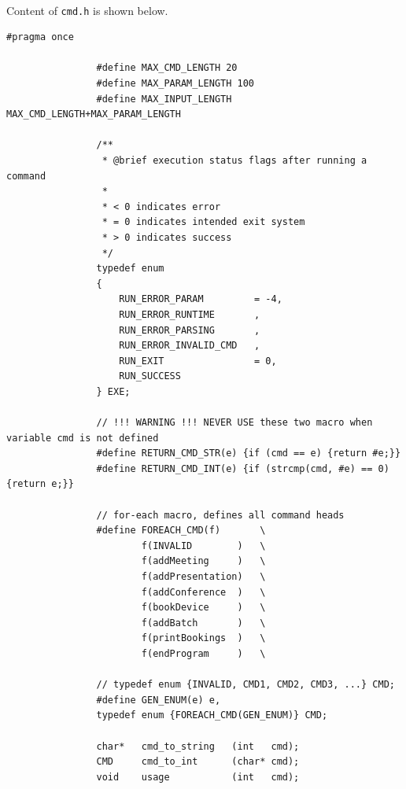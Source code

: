\documentclass{article}
\begin{document}
            \paragraph{}
                Content of \texttt{cmd.h} is shown below.
            \begin{Verbatim}[gobble=8]
                #pragma once

                #define MAX_CMD_LENGTH 20
                #define MAX_PARAM_LENGTH 100
                #define MAX_INPUT_LENGTH MAX_CMD_LENGTH+MAX_PARAM_LENGTH
                
                /**
                 * @brief execution status flags after running a command
                 * 
                 * < 0 indicates error
                 * = 0 indicates intended exit system
                 * > 0 indicates success
                 */ 
                typedef enum
                {
                    RUN_ERROR_PARAM         = -4,
                    RUN_ERROR_RUNTIME       ,
                    RUN_ERROR_PARSING       ,
                    RUN_ERROR_INVALID_CMD   ,
                    RUN_EXIT                = 0,
                    RUN_SUCCESS
                } EXE;
                
                // !!! WARNING !!! NEVER USE these two macro when variable cmd is not defined
                #define RETURN_CMD_STR(e) {if (cmd == e) {return #e;}}
                #define RETURN_CMD_INT(e) {if (strcmp(cmd, #e) == 0) {return e;}}
                
                // for-each macro, defines all command heads
                #define FOREACH_CMD(f)       \
                        f(INVALID        )   \
                        f(addMeeting     )   \
                        f(addPresentation)   \
                        f(addConference  )   \
                        f(bookDevice     )   \
                        f(addBatch       )   \
                        f(printBookings  )   \
                        f(endProgram     )   \
                
                // typedef enum {INVALID, CMD1, CMD2, CMD3, ...} CMD;
                #define GEN_ENUM(e) e,
                typedef enum {FOREACH_CMD(GEN_ENUM)} CMD;
                
                char*   cmd_to_string   (int   cmd);
                CMD     cmd_to_int      (char* cmd);
                void    usage           (int   cmd);
            \end{Verbatim}
\end{document}
